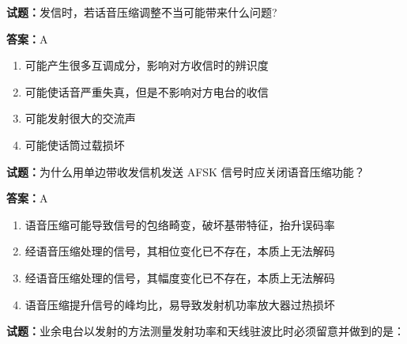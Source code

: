 \documentclass{ctexbook}
\begin{document}




\vspace{1em}

\textbf{试题：}发信时，若话音压缩调整不当可能带来什么问题? 

\textbf{答案：}A 

\begin{enumerate}[leftmargin=3em]
  \item 可能产生很多互调成分，影响对方收信时的辨识度 

  \item 可能使话音严重失真，但是不影响对方电台的收信 

  \item 可能发射很大的交流声 

  \item 可能使话筒过载损坏 

\end{enumerate}





\vspace{1em}

\textbf{试题：}为什么用单边带收发信机发送 AFSK 信号时应关闭语音压缩功能？ 

\textbf{答案：}A 

\begin{enumerate}[leftmargin=3em]
  \item 语音压缩可能导致信号的包络畸变，破坏基带特征，抬升误码率 

  \item 经语音压缩处理的信号，其相位变化已不存在，本质上无法解码 

  \item 经语音压缩处理的信号，其幅度变化已不存在，本质上无法解码 

  \item 语音压缩提升信号的峰均比，易导致发射机功率放大器过热损坏 

\end{enumerate}





\vspace{1em}

\textbf{试题：}业余电台以发射的方法测量发射功率和天线驻波比时必须留意并做到的是： 
\end{document}
